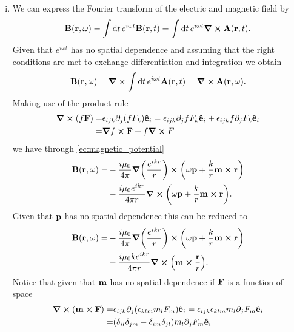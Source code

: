 \documentclass{article}
\begin{document}
\begin{enumerate}[(i)]
\item We can express the Fourier transform of the electric and magnetic field by
\begin{equation}
\vb{B}(\vb{r},\omega)=\int\dd{t}e^{i\omega t}\vb{B}(\vb{r},t)=\int\dd{t}e^{i\omega t}\curl{\vb{A}}(\vb{r},t).
\end{equation}
Given that $e^{i\omega t}$ has no spatial dependence and assuming that the right conditions are met to exchange differentiation and integration we obtain
\begin{equation}
\vb{B}(\vb{r},\omega)=\curl{\int\dd{t}e^{i\omega t}\vb{A}(\vb{r},t)}=\curl{\vb{A}}(\vb{r},\omega).
\end{equation}
Making use of the product rule 
\begin{align}
\begin{split}
\curl(f\vb{F})=&\epsilon_{ijk}\partial_j(fF_k)\vu{e}_i=\epsilon_{ijk}\partial_jfF_k\vu{e}_i+\epsilon_{ijk}f\partial_jF_k\vu{e}_i\\
=&\grad{f}\cross\vb{F}+f\curl{F}
\end{split}
\end{align}
we have through \eqref{ec:magnetic_potential}
\begin{align}
\begin{split}
\vb{B}(\vb{r},\omega)=&-\frac{i\mu_0}{4\pi}\grad(\frac{e^{ikr}}{r})\cross\qty(\omega\vb{p}+\frac{k}{r}\vb{m}\cross\vb{r})\\
&-\frac{i\mu_0e^{ikr}}{4\pi r}\curl(\omega\vb{p}+\frac{k}{r}\vb{m}\cross\vb{r}).
\end{split}
\end{align}
Given that $\vb{p}$ has no spatial dependence this can be reduced to
\begin{align}
\begin{split}
\vb{B}(\vb{r},\omega)=&-\frac{i\mu_0}{4\pi}\grad(\frac{e^{ikr}}{r})\cross\qty(\omega\vb{p}+\frac{k}{r}\vb{m}\cross\vb{r})\\
&-\frac{i\mu_0ke^{ikr}}{4\pi r}\curl(\vb{m}\cross\frac{\vb{r}}{r}).
\end{split}
\end{align}
Notice that given that $\vb{m}$ has no spatial dependence if $\vb{F}$ is a function of space
\begin{align}\label{ec:product_rule}
\begin{split}
\curl(\vb{m}\cross\vb{F})=&\epsilon_{ijk}\partial_j(\epsilon_{klm}m_lF_m)\vu{e}_i=\epsilon_{ijk}\epsilon_{klm}m_l\partial_jF_m\vu{e}_i\\
=&(\delta_{il}\delta_{jm}-\delta_{im}\delta_{jl})m_l\partial_jF_m\vu{e}_i\\

\end{split}
\end{align}
\end{enumerate}
\end{document}
